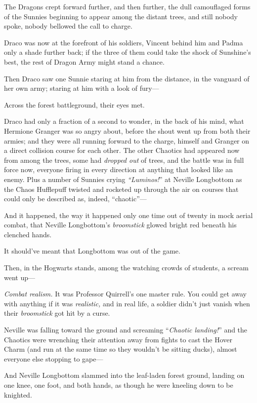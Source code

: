 The Dragons crept forward further, and then further, the dull
camouflaged forms of the Sunnies beginning to appear among the
distant trees, and still nobody spoke, nobody bellowed the call to
charge.

Draco was now at the forefront of his soldiers, Vincent behind
him and Padma only a shade further back; if the three of them could
take the shock of Sunshine’s best, the rest of Dragon Army might
stand a chance.

Then Draco saw one Sunnie staring at him from the distance, in
the vanguard of her own army; staring at him with a look of fury—

Across the forest battleground, their eyes met.

Draco had only a fraction of a second to wonder, in the back of
his mind, what Hermione Granger was so angry about, before the
shout went up from both their armies; and they were all running
forward to the charge, himself and Granger on a direct collision
course for each other.
\sbreak
The other Chaotics had appeared now from among the trees, some
had \emph{dropped out} of trees, and the battle was in full force
now, everyone firing in every direction at anything that looked
like an enemy. Plus a number of Sunnies crying \emph{“Luminos!}” at
Neville Longbottom as the Chaos Hufflepuff twisted and rocketed up
through the air on courses that could only be described as, indeed,
“chaotic”—

And it happened, the way it happened only one time out of twenty
in mock aerial combat, that Neville Longbottom’s \emph{broomstick}
glowed bright red beneath his clenched hands.

It should’ve meant that Longbottom was out of the game.

Then, in the Hogwarts stands, among the watching crowds of
students, a scream went up—

\emph{Combat realism.} It was Professor Quirrell’s one master
rule. You could get away with anything if it was \emph{realistic,}
and in real life, a soldier didn’t just vanish when their
\emph{broomstick} got hit by a curse.

Neville was falling toward the ground and screaming “\emph{Chaotic
landing!}” and the Chaotics were wrenching their attention away
from fights to cast the Hover Charm (and run at the same time so
they wouldn’t be sitting ducks), almost everyone else stopping to
gape—

And Neville Longbottom slammed into the leaf-laden forest
ground, landing on one knee, one foot, and both hands, as though he
were kneeling down to be knighted.

